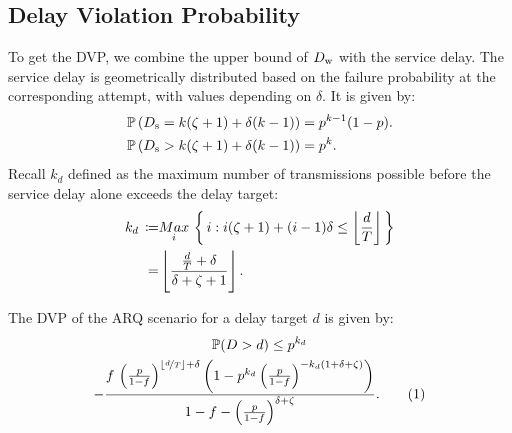 \subsection{Delay Violation Probability}\label{NoIR_dvp}
To get the DVP, we combine the upper bound of $D_{\mathrm{w}}$ with the service delay. The service delay is geometrically distributed based on the failure probability at the corresponding attempt, with values depending on $\delta$. It is given by:
\begin{align}
    \mathbb{P}\left(D_{\mathrm{s}} =k({\zeta}+1)+\delta(k-1)\right) &= p^{k-1}(1-p).\label{eq:secARQ_servDelay}\\
    \mathbb{P}\left(D_{\mathrm{s}} >k({\zeta}+1)+\delta(k-1)\right) &= p^{k}.\nonumber
\end{align}
Recall $k_d$ defined as the maximum number of transmissions possible before the service delay alone exceeds the delay target:
\begin{align}
    k_d\,\coloneqq& \underset{i}{Max}\,\left\{\,i:i({\zeta}+1)+(i-1)\delta\leq\left\lfloor\frac{d}{T}\right\rfloor\,\right\}\nonumber\\
    =&\left\lfloor\frac{\frac{d}{T}+\delta}{\delta+{\zeta}+1}\right\rfloor.\label{eq:secARQ_kd}
\end{align}
\begin{theorem}\label{theorem_arq_dvp}
The DVP of the ARQ scenario for a delay target $d$ is given by:
\begin{multline}
\mathbb{P}(\dtot >d)\leq p^{ k_d } \\-  
\dfrac{f\,\left(\frac{p}{1-f}\right)^{  \left\lfloor\nicefrac{d}{T}\right\rfloor +\delta}
\left(1-p^{ k_d }\left(\frac{p}{1-f}\right)^{- k_d (1+\delta+\ddecod)}
\right)}
{1-f-\left(\frac{p}{1-f}\right)^{\delta+\ddecod}}.\numberthis\label{dvpbound}
\end{multline}
\end{theorem}
